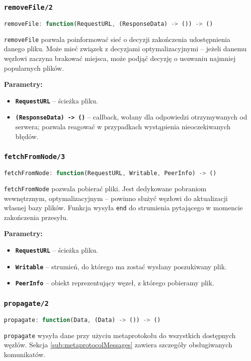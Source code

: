 % 

\subsubsection{\texttt{removeFile/2}}
\begin{lstlisting}[language=javascript]
    removeFile: function(RequestURL, (ResponseData) -> ()) -> ()
\end{lstlisting}
\texttt{removeFile} pozwala poinformować sieć o decyzji zakończenia udostępnienia danego pliku. Może mieć związek z decyzjami optymalizacyjnymi -- jeżeli danemu węzłowi zaczyna brakować miejsca, może podjąć decyzję o usuwaniu najmniej popularnych plików.

\textbf{Parametry:}
\begin{itemize}
    \item \textbf{\texttt{RequestURL}} -- ścieżka pliku.
    \item \textbf{\texttt{(ResponseData) -> ()}} -- callback, wołany dla odpowiedzi otrzymywanych od serwera; pozwala reagować w przypadkach wystąpienia nieoczekiwanych błędów.
\end{itemize}

% 

\subsubsection{\texttt{fetchFromNode/3}}
\begin{lstlisting}[language=javascript]
    fetchFromNode: function(RequestURL, Writable, PeerInfo) -> ()
\end{lstlisting}
\texttt{fetchFromNode} pozwala pobierać pliki. Jest dedykowane pobraniom wewnętrznym, optymalizacyjnym -- powinno służyć węzłowi do aktualizacji własnej bazy plików. Funkcja wysyła \texttt{end} do strumienia pytającego w momencie zakończenia przesyłu.

\textbf{Parametry:}
\begin{itemize}
    \item \textbf{\texttt{RequestURL}} -- ścieżka pliku.
    \item \textbf{\texttt{Writable}} -- strumień, do którego ma zostać wysłany poszukiwany plik.
    \item \textbf{\texttt{PeerInfo}} -- obiekt reprezentujący węzeł, z którego pobieramy plik.
\end{itemize}


% 

\subsubsection{\texttt{propagate/2}}
\begin{lstlisting}[language=javascript]
    propagate: function(Data, (Data) -> ()) -> ()
\end{lstlisting}
\texttt{propagate} wysyła dane przy użyciu metaprotokołu do wszystkich dostępnych węzłów. Sekcja \ref{sub:metaprotocolMessages} zawiera szczegóły obsługiwanych komunikatów.

